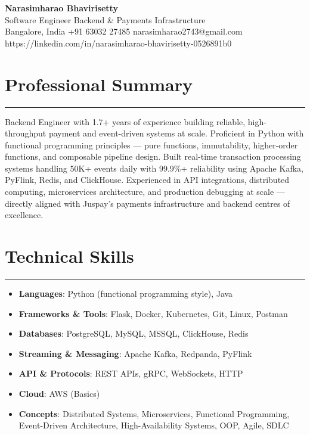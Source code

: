\documentclass[10pt]{article}
\begin{document}
\begin{center}
  {\huge\textbf{Narasimharao Bhavirisetty}}\\[3pt]
  Software Engineer \textbullet{} Backend \& Payments Infrastructure \\[3pt]
  Bangalore, India \textbullet{} +91 63032 27485 \textbullet{} narasimharao2743@gmail.com \textbullet{} https://linkedin.com/in/narasimharao-bhavirisetty-0526891b0
\end{center}

\vspace{4pt}

\section*{Professional Summary}
\vspace{1pt}\hrule\vspace{4pt}
Backend Engineer with 1.7+ years of experience building reliable, high-throughput payment and event-driven systems at scale. Proficient in Python with functional programming principles — pure functions, immutability, higher-order functions, and composable pipeline design. Built real-time transaction processing systems handling 50K+ events daily with 99.9\%+ reliability using Apache Kafka, PyFlink, Redis, and ClickHouse. Experienced in API integrations, distributed computing, microservices architecture, and production debugging at scale — directly aligned with Juspay's payments infrastructure and backend centres of excellence.

\section*{Technical Skills}
\vspace{1pt}\hrule\vspace{4pt}
\begin{itemize}
  \item \textbf{Languages}: Python (functional programming style), Java
  \item \textbf{Frameworks \& Tools}: Flask, Docker, Kubernetes, Git, Linux, Postman
  \item \textbf{Databases}: PostgreSQL, MySQL, MSSQL, ClickHouse, Redis
  \item \textbf{Streaming \& Messaging}: Apache Kafka, Redpanda, PyFlink
  \item \textbf{API \& Protocols}: REST APIs, gRPC, WebSockets, HTTP
  \item \textbf{Cloud}: AWS (Basics)
  \item \textbf{Concepts}: Distributed Systems, Microservices, Functional Programming, Event-Driven Architecture, High-Availability Systems, OOP, Agile, SDLC
\end{itemize}
\end{document}
